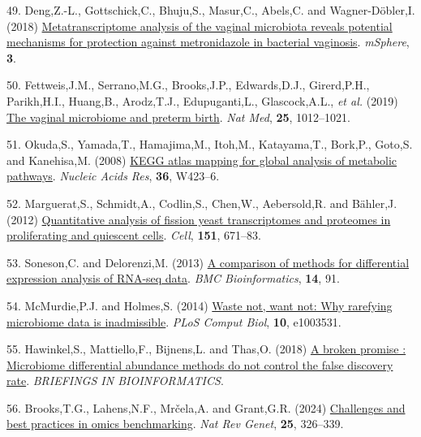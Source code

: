 \documentclass[
]{article}
\newlength{\cslhangindent}
\newenvironment{CSLReferences}[2] %
 {\begin{list}{}{%
  \setlength{\itemindent}{0pt}
  \setlength{\leftmargin}{0pt}
  \setlength{\parsep}{0pt}
  \ifodd #1
   \setlength{\leftmargin}{\cslhangindent}
   \setlength{\itemindent}{-1\cslhangindent}
  \fi
  \setlength{\itemsep}{#2\baselineskip}}}
 {\end{list}}
\begin{document}
\begin{CSLReferences}{1}{1}
49. Deng,Z.-L., Gottschick,C., Bhuju,S., Masur,C., Abels,C. and
Wagner-Döbler,I. (2018)
\href{https://doi.org/10.1128/mSphereDirect.00262-18}{Metatranscriptome
analysis of the vaginal microbiota reveals potential mechanisms for
protection against metronidazole in bacterial vaginosis}.
\emph{mSphere}, \textbf{3}.

50. Fettweis,J.M., Serrano,M.G., Brooks,J.P., Edwards,D.J., Girerd,P.H.,
Parikh,H.I., Huang,B., Arodz,T.J., Edupuganti,L., Glascock,A.L.,
\emph{et al.} (2019)
\href{https://doi.org/10.1038/s41591-019-0450-2}{The vaginal microbiome
and preterm birth}. \emph{Nat Med}, \textbf{25}, 1012--1021.

51. Okuda,S., Yamada,T., Hamajima,M., Itoh,M., Katayama,T., Bork,P.,
Goto,S. and Kanehisa,M. (2008)
\href{https://doi.org/10.1093/nar/gkn282}{KEGG atlas mapping for global
analysis of metabolic pathways}. \emph{Nucleic Acids Res}, \textbf{36},
W423--6.

52. Marguerat,S., Schmidt,A., Codlin,S., Chen,W., Aebersold,R. and
Bähler,J. (2012)
\href{https://doi.org/10.1016/j.cell.2012.09.019}{Quantitative analysis
of fission yeast transcriptomes and proteomes in proliferating and
quiescent cells}. \emph{Cell}, \textbf{151}, 671--83.

53. Soneson,C. and Delorenzi,M. (2013)
\href{https://doi.org/10.1186/1471-2105-14-91}{A comparison of methods
for differential expression analysis of {RNA-seq} data}. \emph{BMC
Bioinformatics}, \textbf{14}, 91.

54. McMurdie,P.J. and Holmes,S. (2014)
\href{https://doi.org/10.1371/journal.pcbi.1003531}{Waste not, want not:
Why rarefying microbiome data is inadmissible}. \emph{PLoS Comput Biol},
\textbf{10}, e1003531.

55. Hawinkel,S., Mattiello,F., Bijnens,L. and Thas,O. (2018)
\href{http://dx.doi.org/10.1093/bib/bbx104}{A broken promise :
Microbiome differential abundance methods do not control the false
discovery rate}. \emph{BRIEFINGS IN BIOINFORMATICS}.

56. Brooks,T.G., Lahens,N.F., Mrčela,A. and Grant,G.R. (2024)
\href{https://doi.org/10.1038/s41576-023-00679-6}{Challenges and best
practices in omics benchmarking}. \emph{Nat Rev Genet}, \textbf{25},
326--339.


\end{CSLReferences}
\end{document}
